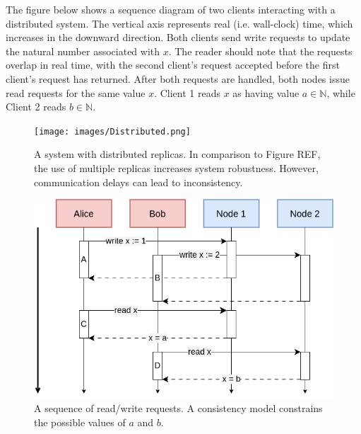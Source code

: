 The figure below shows a sequence diagram of two clients interacting
with a distributed system. The vertical axis represents real
(i.e. wall-clock) time, which increases in the downward
direction. Both clients send write requests to update the natural
number associated with $x$. The reader should note that the requests
overlap in real time, with the second client's request accepted before
the first client's request has returned. After both requests are
handled, both nodes issue read requests for the same value $x$. Client
1 reads $x$ as having value $a \in \mathbb{N}$, while Client 2 reads
$b \in \mathbb{N}$.

\begin{figure}
  \texttt{[image: images/Distributed.png]}
  \caption{A system with distributed replicas. In comparison to Figure REF, the use of multiple replicas increases system robustness. However, communication delays can lead to inconsistency.}
\end{figure}

\begin{figure}
  \includegraphics[scale=0.6]{images/Requests.png}
  \caption{A sequence of read/write requests. A consistency model constrains the possible values of $a$ and $b$.}
\end{figure}


